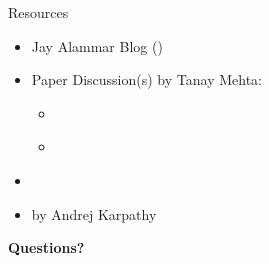 \documentclass[10pt]{beamer}
\begin{document}
\begin{frame}[fragile]{Resources}

	\begin{itemize}
		\item Jay Alammar Blog (\href{https://jalammar.github.io/}{})
		\item Paper Discussion(s) by Tanay Mehta:
		      \begin{itemize}
			      \item \href{https://www.youtube.com/watch?v=adGf740I0e8}{}
			      \item \href{https://www.youtube.com/watch?v=X_haaed9Lfo}{}
		      \end{itemize}
		\item
		      \href{https://www.cs.princeton.edu/courses/archive/spring20/cos598C/lectures/lec4-pretraining.pdf}{}
		\item \href{https://www.youtube.com/watch?v=kCc8FmEb1nY}{} by Andrej Karpathy
	\end{itemize}

\end{frame}



{
\begin{frame}[standout]
	\textbf{Questions?}
\end{frame}
}

%
% 	
% 	
%
\end{document}
